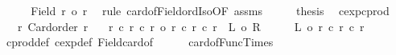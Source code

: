 \begin{isabellebody}
\ \ \isamarkupfalse%
\ \isamarkupfalse%
\ {\isachardoublequoteopen}{\isacharbar}{\kern0pt}Field\ r{\isacharbar}{\kern0pt}\ {\isacharequal}{\kern0pt}o\ r{\isachardoublequoteclose}\ \isamarkupfalse%
\ {\isacharparenleft}{\kern0pt}rule\ card{\isacharunderscore}{\kern0pt}of{\isacharunderscore}{\kern0pt}Field{\isacharunderscore}{\kern0pt}ordIso{\isacharbrackleft}{\kern0pt}OF\ assms{\isacharbrackright}{\kern0pt}{\isacharparenright}{\kern0pt}\isanewline
\ \ \isamarkupfalse%
\ \isamarkupfalse%
\ {\isacharquery}{\kern0pt}thesis\ \isacommand{{\isachardot}{\kern0pt}}\isamarkupfalse%
\isanewline
{}\isamarkupfalse%
%
\endisatagproof
{\isafoldproof}%
%
\isadelimproof
\isanewline
%
\endisadelimproof
\isanewline
{}\isamarkupfalse%
\ cexp{\isacharunderscore}{\kern0pt}cprod{\isacharcolon}{\kern0pt}\isanewline
\ \ \ r{}{\isacharcolon}{\kern0pt}\ {\isachardoublequoteopen}Card{\isacharunderscore}{\kern0pt}order\ r{}{\isachardoublequoteclose}\isanewline
\ \ \ {\isachardoublequoteopen}{\isacharparenleft}{\kern0pt}r{}\ {\isacharcircum}{\kern0pt}c\ r{}{\isacharparenright}{\kern0pt}\ {\isacharcircum}{\kern0pt}c\ r{}\ {\isacharequal}{\kern0pt}o\ r{}\ {\isacharcircum}{\kern0pt}c\ {\isacharparenleft}{\kern0pt}r{}\ {\isacharasterisk}{\kern0pt}c\ r{}{\isacharparenright}{\kern0pt}{\isachardoublequoteclose}\ {\isacharparenleft}{\kern0pt}\ {\isachardoublequoteopen}{\isacharquery}{\kern0pt}L\ {\isacharequal}{\kern0pt}o\ {\isacharquery}{\kern0pt}R{\isachardoublequoteclose}{\isacharparenright}{\kern0pt}\isanewline
%
\isadelimproof
%
\endisadelimproof
%
\isatagproof
{}\isamarkupfalse%
\ {\isacharminus}{\kern0pt}\isanewline
\ \ \isamarkupfalse%
\ {\isachardoublequoteopen}{\isacharquery}{\kern0pt}L\ {\isacharequal}{\kern0pt}o\ r{}\ {\isacharcircum}{\kern0pt}c\ {\isacharparenleft}{\kern0pt}r{}\ {\isacharasterisk}{\kern0pt}c\ r{}{\isacharparenright}{\kern0pt}{\isachardoublequoteclose}\isanewline
\ \ \ \ \isamarkupfalse%
\ cprod{\isacharunderscore}{\kern0pt}def\ cexp{\isacharunderscore}{\kern0pt}def\ Field{\isacharunderscore}{\kern0pt}card{\isacharunderscore}{\kern0pt}of\isanewline
\ \ \ \ \isamarkupfalse%
\ card{\isacharunderscore}{\kern0pt}of{\isacharunderscore}{\kern0pt}Func{\isacharunderscore}{\kern0pt}Times\ \isamarkupfalse%

\end{isabellebody}
